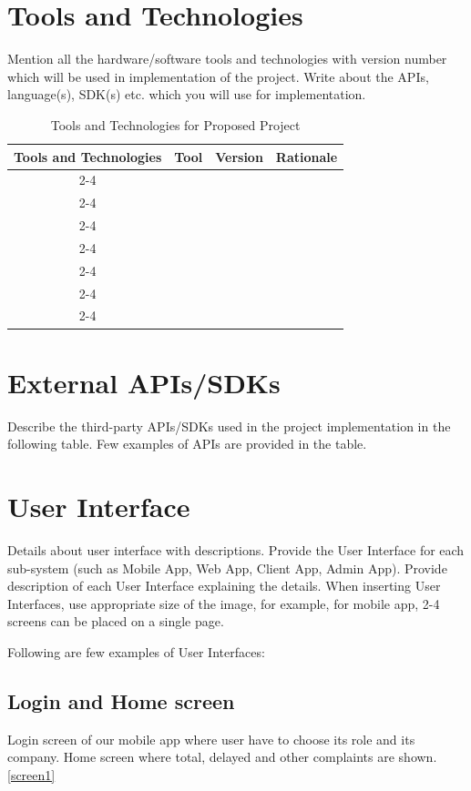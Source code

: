 \documentclass[A4paper,12pt]{report}
\theoremstyle{plain}
\theoremstyle{definition}
\theoremstyle{remark}
\numberwithin{equation}{section}
\begin{document}
\section{Tools and Technologies}
Mention all the hardware/software tools and technologies with version number which will be used in implementation of the project. Write about the APIs, language(s), SDK(s) etc. which you will use for implementation. 

\begin{table}[h]
\centering
\caption{Tools and Technologies for Proposed Project}
\begin{tabular}{|c|p{3.5cm}|p{3.5cm}|p{3.5cm}|}
\hline
\multirow{8}{*}{\textbf{Tools and Technologies}} & \textbf{Tool} & \textbf{Version} & \textbf{Rationale} \\ \cline{2-4}
& & & \\ \cline{2-4}
& & & \\ \cline{2-4}
& & & \\ \cline{2-4}
& & & \\ \cline{2-4}
& & & \\ \cline{2-4}
& & & \\ \cline{2-4}
& & & \\ \hline
\end{tabular}
\end{table}


\section{External APIs/SDKs}
Describe the third-party APIs/SDKs used in the project implementation in the following table. Few examples of APIs are provided in the table.

\section{User Interface}
Details about user interface with descriptions. Provide the User Interface for each sub-system (such as Mobile App, Web App, Client App, Admin App). Provide description of each User Interface explaining the details.
When inserting User Interfaces, use appropriate size of the image, for example, for mobile app, 2-4 screens can be placed on a single page.

Following are few examples of User Interfaces:

\subsection{Login and Home screen}
Login screen of our mobile app where user have to choose its role and its company.
Home screen where total, delayed and other complaints are shown. \ref{screen1}
\end{document}
